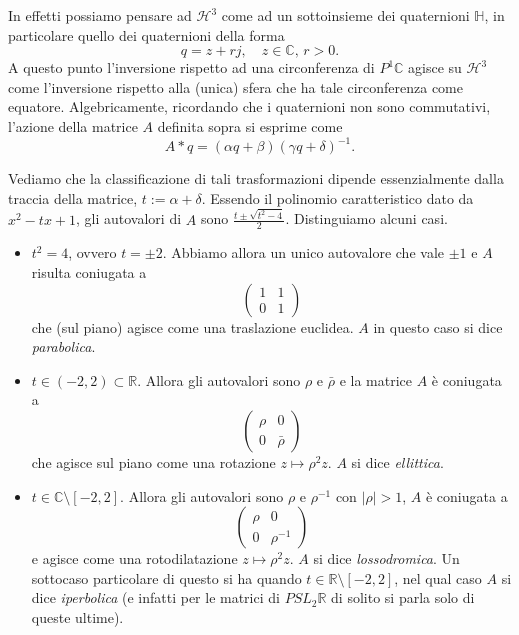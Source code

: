 \begin{osservazione}
In effetti possiamo pensare ad $\mathcal H^3$ come ad un sottoinsieme dei quaternioni $\mathbb H$, in particolare quello dei quaternioni della forma 
$$q = z + rj,\quad z\in\mathbb C,\, r>0.$$
A questo punto l'inversione rispetto ad una circonferenza di $P^1\mathbb C$ agisce su $\mathcal H^3$ come l'inversione rispetto alla (unica) sfera che ha tale circonferenza come equatore. 
Algebricamente, ricordando che i quaternioni non sono commutativi, l'azione della matrice $A$ definita sopra si esprime come 
$$A*q = (\alpha q + \beta)(\gamma q + \delta)^{-1}.$$
\end{osservazione}

Vediamo che la classificazione di tali trasformazioni dipende essenzialmente dalla traccia della matrice, $t := \alpha + \delta$.
Essendo il polinomio caratteristico dato da $x^2 - tx + 1$, gli autovalori di $A$ sono $\frac{t\pm\sqrt{t^2 - 4}}{2}$. Distinguiamo alcuni casi.
\begin{itemize}
    \item $t^2 = 4$, ovvero $t = \pm2$. Abbiamo allora un unico autovalore che vale $\pm1$ e $A$ risulta coniugata a 
    $$\begin{pmatrix}1 & 1\\0 & 1\end{pmatrix}$$
    che (sul piano) agisce come una traslazione euclidea. $A$ in questo caso si dice \emph{parabolica}.
    \item $t\in(-2, 2)\subset\mathbb R$. Allora gli autovalori sono $\rho$ e $\bar\rho$ e la matrice $A$ è coniugata a 
    $$\begin{pmatrix}\rho & 0\\0 & \bar\rho\end{pmatrix}$$
    che agisce sul piano come una rotazione $z\mapsto \rho^2 z$. 
    $A$ si dice \emph{ellittica}.
    \item $t\in\mathbb C\setminus [-2,2]$. Allora gli autovalori sono $\rho$ e $\rho^{-1}$ con $|\rho|>1$, $A$ è coniugata a 
    $$\begin{pmatrix}\rho & 0\\0 & \rho^{-1}\end{pmatrix}$$
    e agisce come una rotodilatazione $z\mapsto\rho^2 z$. $A$ si dice \emph{lossodromica}.
    Un sottocaso particolare di questo si ha quando $t\in\mathbb R\setminus [-2,2]$, nel qual caso $A$ si dice \emph{iperbolica} (e infatti per le matrici di $PSL_2\mathbb R$ di solito si parla solo di queste ultime).
\end{itemize}

